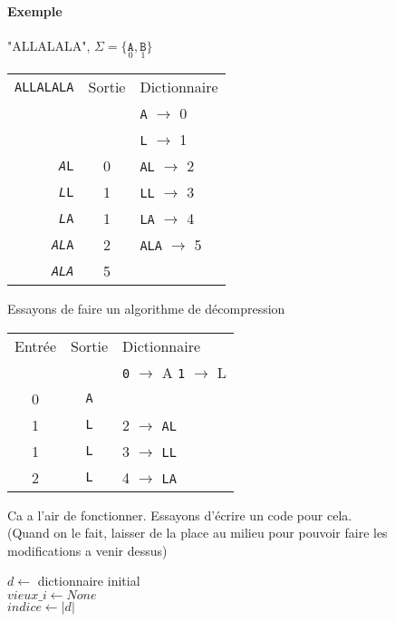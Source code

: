 \paragraph{Exemple} "ALLALALA", $\Sigma = \{\underset{0}{\texttt A}, \underset{1}{\texttt B}\}$\\
\begin{tabular}{r|c|l}
	\texttt{ALLALALA} & Sortie & Dictionnaire \\
	&& \texttt A $\to$ 0\\
	&& \texttt L $\to$ 1\\
	\texttt{\emph{A}L\enspace\enspace\enspace\enspace\enspace\enspace} &0& \texttt{AL} $\to$ 2\\
	\texttt{\emph{L}L\enspace\enspace\enspace\enspace\enspace} &1& \texttt{LL} $\to$ 3\\
	\texttt{\emph{L}A\enspace\enspace\enspace\enspace} &1& \texttt{LA} $\to$ 4\\
	\texttt{\emph{AL}A\enspace\enspace} &2& \texttt{ALA} $\to$ 5\\
	\texttt{\emph{ALA}} &5&\\
\end{tabular}


\begin{com}
	Essayons de faire un algorithme de décompression
\end{com}

\begin{tabular}{c|c|l}
	Entrée & Sortie & Dictionnaire \\
	& & \texttt 0 $\to$ A \qquad \texttt 1 $\to$ L\\
	0 & \texttt A & \\
	1 & \texttt L & 2 $\to$ \texttt{AL}\\
	1 & \texttt L & 3 $\to$ \texttt{LL}\\
	2 & \texttt L & 4 $\to$ \texttt{LA}\\
\end{tabular}


\begin{com}
	Ca a l'air de fonctionner. Essayons d'écrire un code pour cela.\\
	(Quand on le fait, laisser de la place au milieu pour pouvoir faire les modifications a venir dessus)
\end{com}

\begin{algorithm}[H]
	$d \gets$ dictionnaire initial\\
	$vieux\_i \gets None$\\
	$indice \gets |d|$\\
\end{algorithm}

